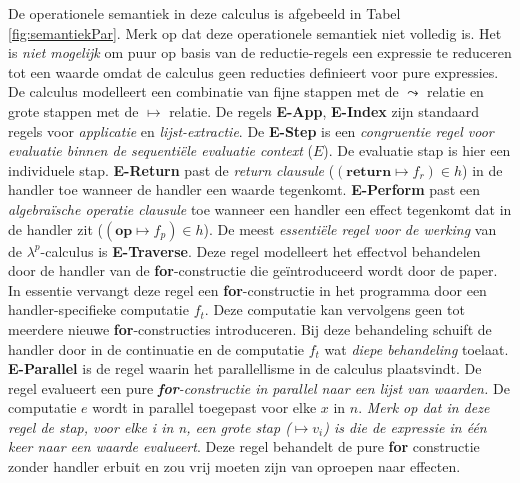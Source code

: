 De operationele semantiek in deze calculus is afgebeeld in Tabel \ref{fig:semantiekPar}. Merk op dat deze operationele semantiek niet volledig is. Het is \emph{niet mogelijk} om puur op basis van de reductie-regels een expressie te reduceren tot een waarde omdat de calculus geen reducties definieert voor pure expressies. De calculus modelleert een combinatie van fijne stappen met de $\leadsto$ relatie en grote stappen met de $\mapsto$ relatie. \newline 
De regels \textbf{E-App}, \textbf{E-Index} zijn standaard regels voor \emph{applicatie} en \emph{lijst-extractie}. \newline
De \textbf{E-Step} is een \emph{congruentie regel voor evaluatie binnen de sequentiële evaluatie context} ($E$). De evaluatie stap is hier een individuele stap. \newline 
\textbf{E-Return} past de \emph{return clausule} ($(\textbf{return} \mapsto f_{r}) \in h$) in de handler toe wanneer de handler een waarde tegenkomt. \newline
\textbf{E-Perform} past een \emph{algebraïsche operatie clausule} toe wanneer een handler een effect tegenkomt dat in de handler zit ($(\textbf{op} \mapsto f_{p}) \in h$).\newline %
De meest \emph{essentiële regel voor de werking} van de $\lambda^{p}$-calculus is \textbf{E-Traverse}. Deze regel modelleert het effectvol behandelen door de handler van de \textbf{for}-constructie die geïntroduceerd wordt door de paper. In essentie vervangt deze regel een \textbf{for}-constructie in het programma door een handler-specifieke computatie $f_t$. Deze computatie kan vervolgens geen tot meerdere nieuwe \textbf{for}-constructies introduceren. Bij deze behandeling schuift de handler door in de continuatie en de computatie $f_t$ wat \emph{diepe behandeling} toelaat. \newline
\textbf{E-Parallel} is de regel waarin het parallellisme in de calculus plaatsvindt. De regel evalueert een pure \emph{\textbf{for}-constructie in parallel naar een lijst van waarden.} De computatie $e$ wordt in parallel toegepast voor elke $x$ in $n$. \emph{Merk op dat in deze regel de stap, voor elke i in n, een grote stap ($\mapsto v_i$) is die de expressie in \'e\'en keer naar een waarde evalueert}. Deze regel behandelt de pure \textbf{for} constructie zonder handler erbuit en zou vrij moeten zijn van oproepen naar effecten. \newline

